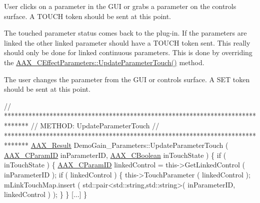 \begin{DoxyEnumerate}
\item User clicks on a parameter in the G\+U\+I or grabs a parameter on the controls surface. A T\+O\+U\+C\+H token should be sent at this point.
\begin{DoxyItemize}
\item The touched parameter status comes back to the plug-\/in. If the parameters are linked the other linked parameter should have a T\+O\+U\+C\+H token sent. This really should only be done for linked continuous parameters. This is done by overriding the \hyperlink{a00018_a1555fe9834764330bd264941a1d6ebc3}{A\+A\+X\+\_\+\+C\+Effect\+Parameters\+::\+Update\+Parameter\+Touch()} method.
\end{DoxyItemize}
\item The user changes the parameter from the G\+U\+I or controls surface. A S\+E\+T token should be sent at this point. 
\begin{DoxyCode}
\textcolor{comment}{// *******************************************************************************}
\textcolor{comment}{// METHOD:  UpdateParameterTouch}
\textcolor{comment}{// *******************************************************************************}
\hyperlink{a00149_a4d8f69a697df7f70c3a8e9b8ee130d2f}{AAX\_Result} DemoGain\_Parameters::UpdateParameterTouch ( \hyperlink{a00149_a1440c756fe5cb158b78193b2fc1780d1}{AAX\_CParamID} inParameterID, 
      \hyperlink{a00149_aa216506530f1d19a2965931ced2b274b}{AAX\_CBoolean} inTouchState )
\{
    \textcolor{keywordflow}{if} ( inTouchState )
    \{
        \hyperlink{a00149_a1440c756fe5cb158b78193b2fc1780d1}{AAX\_CParamID} linkedControl = this->GetLinkedControl ( inParameterID );
        \textcolor{keywordflow}{if} ( linkedControl )
        \{
            this->TouchParameter ( linkedControl );
            mLinkTouchMap.insert ( std::pair<std::string,std::string>( inParameterID, linkedControl ) );
        \}
    \}
    [...]
\}
\end{DoxyCode}


\end{DoxyEnumerate}
